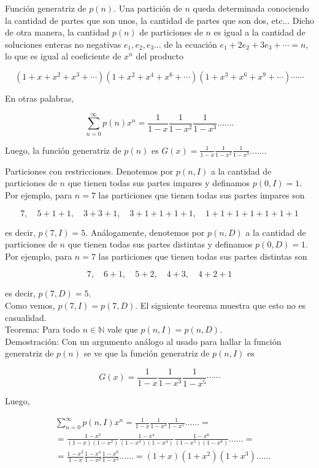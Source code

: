 \documentclass[10pt]{article}
\begin{document}
Función generatriz de $p(n)$. Una partición de $n$ queda determinada conociendo la cantidad de partes que son unos, la cantidad de partes que son dos, etc... Dicho de otra manera, la cantidad $p(n)$ de particiones de $n$ es igual a la cantidad de soluciones enteras no negativas $e_{1}, e_{2}, e_{3} \ldots$ de la ecuación $e_{1}+2 e_{2}+3 e_{3}+\cdots=n$, lo que es igual al coeficiente de $x^{n}$ del producto

$$
\left(1+x+x^{2}+x^{3}+\cdots\right)\left(1+x^{2}+x^{4}+x^{6}+\cdots\right)\left(1+x^{3}+x^{6}+x^{9}+\cdots\right) \cdots \cdots
$$

En otras palabras,

$$
\sum_{n=0}^{\infty} p(n) x^{n}=\frac{1}{1-x} \frac{1}{1-x^{2}} \frac{1}{1-x^{3}} \ldots \ldots .
$$

Luego, la función generatriz de $p(n)$ es $G(x)=\frac{1}{1-x} \frac{1}{1-x^{2}} \frac{1}{1-x^{3}} \ldots \ldots$.

Particiones con restricciones. Denotemos por $p(n, I)$ a la cantidad de particiones de $n$ que tienen todas sus partes impares y definamos $p(0, I)=1$. Por ejemplo, para $n=7$ las particiones que tienen todas sus partes impares son

$$
7, \quad 5+1+1, \quad 3+3+1, \quad 3+1+1+1+1, \quad 1+1+1+1+1+1+1
$$

es decir, $p(7, I)=5$. Análogamente, denotemos por $p(n, D)$ a la cantidad de particiones de $n$ que tienen todas sus partes distintas y definamos $p(0, D)=1$. Por ejemplo, para $n=7$ las particiones que tienen todas sus partes distintas son

$$
7, \quad 6+1, \quad 5+2, \quad 4+3, \quad 4+2+1
$$

es decir, $p(7, D)=5$.\\
Como vemos, $p(7, I)=p(7, D)$. El siguiente teorema muestra que esto no es casualidad.\\
Teorema: Para todo $n \in \mathbb{N}$ vale que $p(n, I)=p(n, D)$.\\
Demostración: Con un argumento análogo al usado para hallar la función generatriz de $p(n)$ se ve que la función generatriz de $p(n, I)$ es

$$
G(x)=\frac{1}{1-x} \frac{1}{1-x^{3}} \frac{1}{1-x^{5}} \cdots \cdots
$$

Luego,

$$
\begin{aligned}
& \sum_{n=0}^{\infty} p(n, I) x^{n}=\frac{1}{1-x} \frac{1}{1-x^{3}} \frac{1}{1-x^{5}} \ldots \ldots= \\
& =\frac{1-x^{2}}{(1-x)\left(1-x^{2}\right)} \frac{1-x^{4}}{\left(1-x^{3}\right)\left(1-x^{4}\right)} \frac{1-x^{6}}{\left(1-x^{5}\right)\left(1-x^{6}\right)} \ldots \ldots= \\
& =\frac{1-x^{2}}{1-x} \frac{1-x^{4}}{1-x^{2}} \frac{1-x^{6}}{1-x^{3}} \ldots \ldots=(1+x)\left(1+x^{2}\right)\left(1+x^{3}\right) \ldots \ldots
\end{aligned}
$$
\end{document}

